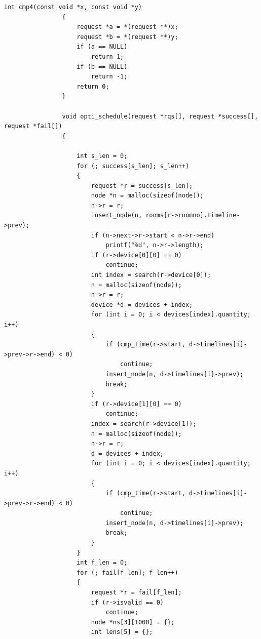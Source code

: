 \documentclass{article}
\begin{document}
\begin{Verbatim}[gobble=8]
                int cmp4(const void *x, const void *y)
                {
                    request *a = *(request **)x;
                    request *b = *(request **)y;
                    if (a == NULL)
                        return 1;
                    if (b == NULL)
                        return -1;
                    return 0;
                }
                
                void opti_schedule(request *rqs[], request *success[], request *fail[])
                {
                
                    int s_len = 0;
                    for (; success[s_len]; s_len++)
                    {
                        request *r = success[s_len];
                        node *n = malloc(sizeof(node));
                        n->r = r;
                        insert_node(n, rooms[r->roomno].timeline->prev);
                        if (n->next->r->start < n->r->end)
                            printf("%d", n->r->length);
                        if (r->device[0][0] == 0)
                            continue;
                        int index = search(r->device[0]);
                        n = malloc(sizeof(node));
                        n->r = r;
                        device *d = devices + index;
                        for (int i = 0; i < devices[index].quantity; i++)
                        {
                            if (cmp_time(r->start, d->timelines[i]->prev->r->end) < 0)
                                continue;
                            insert_node(n, d->timelines[i]->prev);
                            break;
                        }
                        if (r->device[1][0] == 0)
                            continue;
                        index = search(r->device[1]);
                        n = malloc(sizeof(node));
                        n->r = r;
                        d = devices + index;
                        for (int i = 0; i < devices[index].quantity; i++)
                        {
                            if (cmp_time(r->start, d->timelines[i]->prev->r->end) < 0)
                                continue;
                            insert_node(n, d->timelines[i]->prev);
                            break;
                        }
                    }
                    int f_len = 0;
                    for (; fail[f_len]; f_len++)
                    {
                        request *r = fail[f_len];
                        if (r->isvalid == 0)
                            continue;
                        node *ns[3][1000] = {};
                        int lens[5] = {};

\end{Verbatim}
\end{document}
